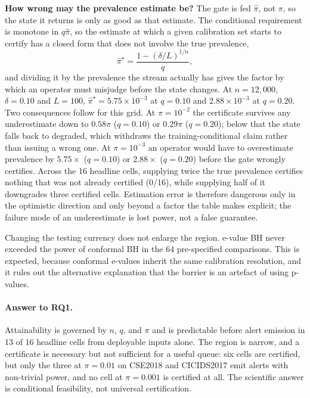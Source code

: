 \documentclass[a4paper,fleqn]{cas-dc}
\begin{document}
\textbf{How wrong may the prevalence estimate be?} The gate is fed $\hat\pi$, not $\pi$, so the state it returns is only as good as that estimate. The conditional requirement is monotone in $q\hat\pi$, so the estimate at which a given calibration set starts to certify has a closed form that does not involve the true prevalence,
\begin{equation}
 \hat\pi^{\star}=\frac{1-(\delta/L)^{1/n}}{q},
 \label{eq:pihat}
\end{equation}
and dividing it by the prevalence the stream actually has gives the factor by which an operator must misjudge before the state changes. At $n=12{,}000$, $\delta=0.10$ and $L=100$, $\hat\pi^{\star}=5.75\times10^{-3}$ at $q=0.10$ and $2.88\times10^{-3}$ at $q=0.20$. Two consequences follow for this grid. At $\pi=10^{-2}$ the certificate survives any underestimate down to $0.58\pi$ ($q=0.10$) or $0.29\pi$ ($q=0.20$); below that the state falls back to degraded, which withdraws the training-conditional claim rather than issuing a wrong one. At $\pi=10^{-3}$ an operator would have to overestimate prevalence by $5.75\times$ ($q=0.10$) or $2.88\times$ ($q=0.20$) before the gate wrongly certifies. Across the 16 headline cells, supplying twice the true prevalence certifies nothing that was not already certified (0/16), while supplying half of it downgrades three certified cells. Estimation error is therefore dangerous only in the optimistic direction and only beyond a factor the table makes explicit; the failure mode of an underestimate is lost power, not a false guarantee.

Changing the testing currency does not enlarge the region. e-value BH never exceeded the power of conformal BH in the 64 pre-specified comparisons. This is expected, because conformal e-values inherit the same calibration resolution, and it rules out the alternative explanation that the barrier is an artefact of using p-values.

\paragraph{Answer to RQ1.} Attainability is governed by $n$, $q$, and $\pi$ and is predictable before alert emission in 13 of 16 headline cells from deployable inputs alone. The region is narrow, and a certificate is necessary but not sufficient for a useful queue: six cells are certified, but only the three at $\pi=0.01$ on CSE2018 and CICIDS2017 emit alerts with non-trivial power, and no cell at $\pi=0.001$ is certified at all. The scientific answer is conditional feasibility, not universal certification.
\end{document}
